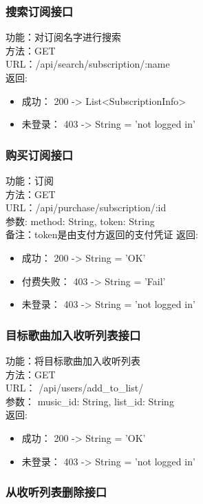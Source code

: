 \subsubsection{搜索订阅接口}

\noindent
功能：对订阅名字进行搜索\\
方法：GET\\
URL：/api/search/subscription/:name\\
返回:
\begin{itemize}
	\item 成功： 200 -> List<SubscriptionInfo>
	\item 未登录： 403 -> String = 'not logged in'
\end{itemize}

\subsubsection{购买订阅接口}

\noindent
功能：订阅\\
方法：GET\\
URL：/api/purchase/subscription/:id\\
参数: method: String, token: String\\
备注：token是由支付方返回的支付凭证
返回:
\begin{itemize}
	\item 成功： 200 -> String = 'OK'
	\item 付费失败： 403 -> String = 'Fail'
	\item 未登录： 403 -> String = 'not logged in'
\end{itemize}

\subsubsection{目标歌曲加入收听列表接口}

\noindent
功能：将目标歌曲加入收听列表\\
方法：GET\\
URL： /api/users/add\_to\_list/\\
参数： music\_id: String, list\_id: String\\
返回:
\begin{itemize}
	\item 成功： 200 -> String = 'OK'
	\item 未登录： 403 -> String = 'not logged in'
\end{itemize}


\subsubsection{从收听列表删除接口}

